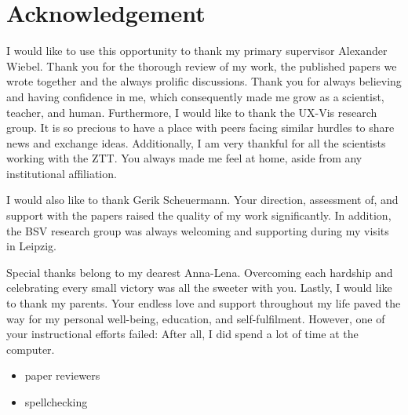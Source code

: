 %
\chapter*{Acknowledgement}
\label{sec:acknowledgement}
\vspace*{-10mm}

I would like to use this opportunity to thank my primary supervisor Alexander Wiebel. Thank you for the thorough review of my work, the published papers we wrote together and the always prolific discussions. Thank you for always believing and having confidence in me, which consequently made me grow as a scientist, teacher, and human. Furthermore, I would like to thank the UX-Vis research group. It is so precious to have a place with peers facing similar hurdles to share news and exchange ideas. Additionally, I am very thankful for all the scientists working with the ZTT. You always made me feel at home, aside from any institutional affiliation.

I would also like to thank Gerik Scheuermann. Your direction, assessment of, and support with the papers raised the quality of my work significantly. In addition, the BSV research group was always welcoming and supporting during my visits in Leipzig.

Special thanks belong to my dearest Anna-Lena. Overcoming each hardship and celebrating every small victory was all the sweeter with you. Lastly, I would like to thank my parents. Your endless love and support throughout my life paved the way for my personal well-being, education, and self-fulfilment. However, one of your instructional efforts failed: After all, I did spend a lot of time at the computer.

\begin{itemize}
    \item paper reviewers
    \item spellchecking
\end{itemize}
